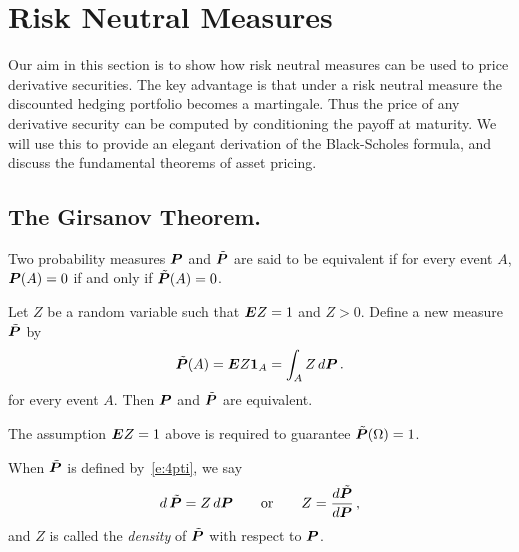 
\ifstandalonechapter\setcounter{chapter}{3}\fi
\chapter{Risk Neutral Measures}

Our aim in this section is to show how risk neutral measures can be used to price derivative securities.
The key advantage is that under a risk neutral measure the discounted hedging portfolio becomes a martingale.
Thus the price of any derivative security can be computed by conditioning the payoff at maturity.
We will use this to provide an elegant derivation of the Black-Scholes formula, and discuss the fundamental theorems of asset pricing.

\section{The Girsanov Theorem.}

\begin{definition}
  Two probability measures $\P$ and $\tilde \P$ are said to be equivalent if for every event $A$, $\P(A) = 0$ if and only if $\tilde \P(A) = 0$.
\end{definition}

\begin{example}
  Let $Z$ be a random variable such that $\E Z = 1$ and $Z > 0$.
  Define a new measure $\tilde\P$ by
  \begin{equation}\label{e:4pti}
    \tilde \P(A) = \E Z \one_A = \int_A Z \, d\P\,.
  \end{equation}
  for every event $A$.
  Then $\P$ and $\tilde\P$ are equivalent.
\end{example}

\begin{remark}
  The assumption $\E Z = 1$ above is required to guarantee $\tilde \P(\Omega) = 1$.
\end{remark}

\begin{definition}
  When $\tilde\P$ is defined by~\eqref{e:4pti}, we say
  \begin{equation*}
    d\, \tilde\P = Z \, d\P
    \qquad\text{or}\qquad
    Z = \frac{d\tilde\P}{d\P}\,,
  \end{equation*}
  and $Z$ is called the \emph{density} of $\tilde\P$ with respect to $\P$.
\end{definition}

